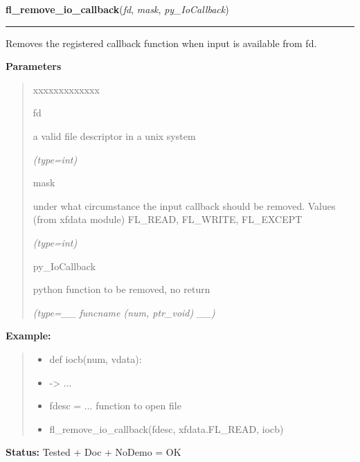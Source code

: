 \hspace{.8\funcindent}\begin{boxedminipage}{\funcwidth}

    \raggedright \textbf{fl\_remove\_io\_callback}(\textit{fd}, \textit{mask}, \textit{py\_IoCallback})

    \vspace{-1.5ex}

    \rule{\textwidth}{0.5\fboxrule}
\setlength{\parskip}{2ex}
    Removes the registered callback function when input is available from 
    fd.

\setlength{\parskip}{1ex}
      \textbf{Parameters}
      \vspace{-1ex}

      \begin{quote}
        \begin{Ventry}{xxxxxxxxxxxxx}

          \item[fd]

          a valid file descriptor in a unix system

            {\it (type=int)}

          \item[mask]

          under what circumstance the input callback should be removed. 
          Values (from xfdata module) FL\_READ, FL\_WRITE, FL\_EXCEPT

            {\it (type=int)}

          \item[py\_IoCallback]

          python function to be removed, no return

            {\it (type=\_\_ funcname (num, ptr\_void) \_\_)}

        \end{Ventry}

      \end{quote}

\textbf{Example:}
\begin{quote}
  \begin{itemize}

  \item
    \setlength{\parskip}{0.6ex}
def iocb(num, vdata):



  \item {\textbar}-{\textgreater}{\textbar} ...



  \item fdesc = ... function to open file



  \item fl\_remove\_io\_callback(fdesc, xfdata.FL\_READ, iocb)



\end{itemize}

\end{quote}

\textbf{Status:} Tested + Doc + NoDemo = OK



    \end{boxedminipage}


